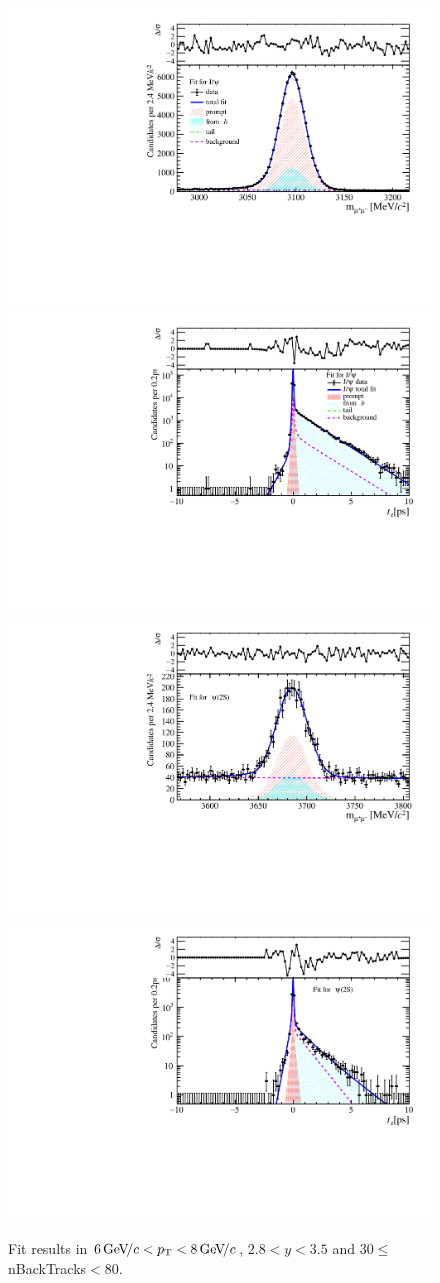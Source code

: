 \begin{figure}[H]
\begin{center}
\includegraphics[width=0.47\linewidth]{pdf/Jpsi/drawmassB/n5y2pt4.pdf}
\includegraphics[width=0.47\linewidth]{pdf/Jpsi/2DFitB/n5y2pt4.pdf}
\vspace*{-0.5cm}
\includegraphics[width=0.47\linewidth]{pdf/Psi2S/drawmassB/n5y2pt4.pdf}
\includegraphics[width=0.47\linewidth]{pdf/Psi2S/2DFitB/n5y2pt4.pdf}
\vspace*{-0.5cm}
\end{center}
\caption{Fit results in $6\text{\,Ge\kern -0.1em V\!/}c<p_{\mathrm{T}}<8\text{\,Ge\kern -0.1em V\!/}c$, $2.8<y<3.5$ and 30$\leq$nBackTracks$<$80.}
\label{Fitn5y2pt4}
\end{figure}

